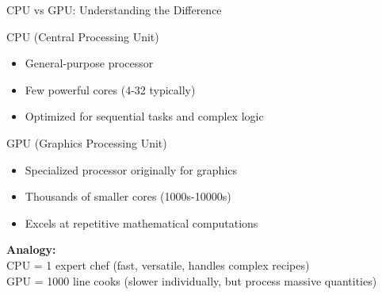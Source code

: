 \documentclass[aspectratio=169]{beamer}
\begin{document}
\begin{frame}{CPU vs GPU: Understanding the Difference}
\begin{block}{CPU (Central Processing Unit)}
\begin{itemize}
    \item General-purpose processor
    \item Few powerful cores (4-32 typically)
    \item Optimized for sequential tasks and complex logic
\end{itemize}
\end{block}

\begin{exampleblock}{GPU (Graphics Processing Unit)}
\begin{itemize}
    \item Specialized processor originally for graphics
    \item Thousands of smaller cores (1000s-10000s)
    \item Excels at repetitive mathematical computations
\end{itemize}
\end{exampleblock}

\begin{center}
\textbf{Analogy:}\\
CPU = 1 expert chef (fast, versatile, handles complex recipes)\\
GPU = 1000 line cooks (slower individually, but process massive quantities)
\end{center}
\end{frame}
\end{document}
